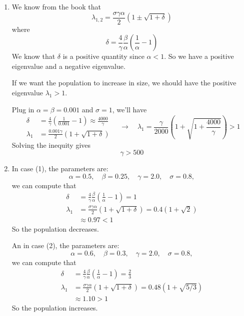 \begin{homeworkProblem}
\begin{enumerate}
        \item We know from the book that \[
            \lambda_{1,2} = \frac{\sigma \gamma \alpha}{2} (1 \pm \sqrt{1 + \delta})
        \] where \[
            \delta = \frac{4}{\gamma}\frac{\beta}{\alpha}
                    \left( \frac{1}{\alpha} - 1\right)
        \]
        We know that $\delta$ is a positive quantity since $\alpha < 1$. So we have
        a positive eigenvalue and a negative eigenvalue.
    
        If we want the population to increase in size, we should have the positive
        eigenvalue $\lambda_1 > 1$.
    
        Plug in $\alpha = \beta = 0.001$ and $\sigma = 1$, we'll have \[
        \begin{aligned}
            \delta &= \frac{4}{\gamma}(\frac{1}{0.001} - 1) \approx \frac{4000}{\gamma}\\
            \lambda_1 &= \frac{0.001\gamma}{2} (1 + \sqrt{1 + \delta})
        \end{aligned}
        \quad\rightarrow\quad
        \lambda_1 = \frac{\gamma}{2000}(1 + \sqrt{1+ \frac{4000}{\gamma}}) > 1
        \]
        Solving the inequity gives \[
            \gamma > 500
        \]
    
        \item In case (1), the parameters are: \[
            \alpha = 0.5, \quad \beta = 0.25, \quad \gamma = 2.0, \quad \sigma = 0.8,
        \] we can compute that \[
        \begin{aligned}
            \delta &= \frac{4}{\gamma}\frac{\beta}{\alpha}
            \left( \frac{1}{\alpha} - 1\right)
            = 1\\
            \lambda_1 &= \frac{\sigma \gamma \alpha}{2} (1 + \sqrt{1 + \delta})
            = 0.4 (1 + \sqrt{2})\\
            &\approx 0.97 < 1
        \end{aligned}
        \]
        So the population decreases.
    
        An in case (2), the parameters are: \[
            \alpha = 0.6, \quad \beta = 0.3, \quad \gamma = 2.0, \quad \sigma = 0.8,
        \] we can compute that \[
        \begin{aligned}
            \delta &= \frac{4}{\gamma}\frac{\beta}{\alpha}
            \left( \frac{1}{\alpha} - 1\right)
            = \frac{2}{3}\\
            \lambda_1 &= \frac{\sigma \gamma \alpha}{2} (1 + \sqrt{1 + \delta})
            = 0.48 (1 + \sqrt{5/3})\\
            &\approx 1.10 >1
        \end{aligned}
        \]
        So the population increases.
    

\end{enumerate}
\end{homeworkProblem}
